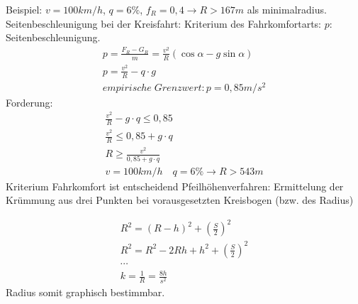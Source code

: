 \documentclass[12pt]{article}
\begin{document}
Beispiel: $v = 100km/h$, $q=6\%$, $f_R = 0,4 \longrightarrow R > 167m$ als minimalradius.\newline
Seitenbeschleunigung bei der Kreisfahrt: \newline
Kriterium des Fahrkomfortarts: \newline
$p$: Seitenbeschleunigung.
\begin{gather*}
p = \frac{F_R - G_R}{m} = \frac{v^2}{R} (\cos \alpha - g \sin \alpha) \\
p = \frac{v^2}{R} - q \cdot g \\
empirische\; Grenzwert: p = 0,85m/s^2
\end{gather*}
Forderung:
\begin{gather*}
\frac{v^2}{R} - g \cdot q \leq 0,85 \\
\frac{v^2}{R} \leq 0,85 + g \cdot q \\
R \geq \frac{v^2}{0,85 + g \cdot q} \\
v = 100km/h \quad q=6\% \longrightarrow R>543m
\end{gather*}
Kriterium Fahrkomfort ist entscheidend \newline
\newline
Pfeilhöhenverfahren: \newline
Ermittelung der Krümmung aus drei Punkten bei vorausgesetzten Kreisbogen (bzw. des Radius)
\begin{figure*}[ht]\centering
\end{figure*}
\begin{gather*}
R^2 = (R-h)^2 + (\frac{S}{2})^2 \\
R^2 = R^2 - 2Rh + h^2 + (\frac{S}{2})^2 \\
\cdots \\
k = \frac{1}{R} = \frac{8h}{s^2}
\end{gather*}
Radius somit graphisch bestimmbar. 
\end{document}
